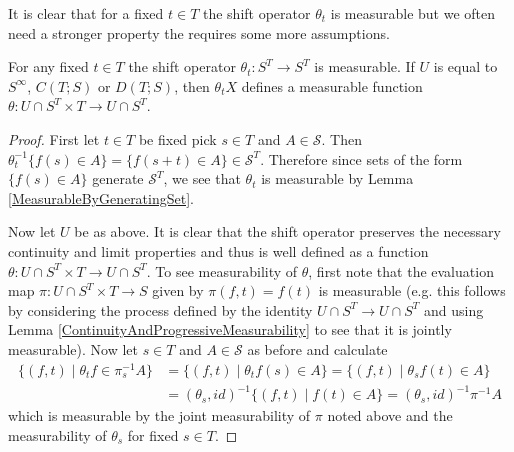 It is clear that for a fixed $t \in T$ the shift operator $\theta_t$
is measurable but we often need a stronger property the requires some
more assumptions.
\begin{lem}\label{MeasurabilityOfShiftOperator}For any fixed $t \in T$ the shift operator $\theta_t : S^T
  \to S^T$ is measurable. If $U$ is equal to $S^\infty$, $C(T; S)$ or
  $D(T; S)$, then $\theta_t X$ defines a measurable function $\theta : U \cap S^T \times
  T \to U \cap S^T$.  
\end{lem}
\begin{proof}
First let $t \in T$ be fixed pick $s \in T$ and $A \in \mathcal{S}$.
Then $\theta_t^{-1} \lbrace f(s) \in A \rbrace = \lbrace f(s+t) \in A
\rbrace \in \mathcal{S}^T$.  Therefore since sets of the form $\lbrace f(s) \in A \rbrace$ generate
$\mathcal{S}^T$, we see that $\theta_t$ is measurable by Lemma
\ref{MeasurableByGeneratingSet}.

Now let $U$ be as above.  It is clear that the shift operator
preserves the necessary continuity and limit properties and thus is
well defined as a function $\theta : U \cap S^T \times T \to U \cap S^T$.  To
see measurability of $\theta$, first note that the evaluation map $\pi : U \cap S^T \times
T \to S$ given by $\pi(f,t) = f(t)$ is measurable (e.g. this follows
by considering the process defined by the identity $U
\cap S^T \to U \cap S^T$ and using Lemma
\ref{ContinuityAndProgressiveMeasurability} to see that it is jointly
measurable).
Now let $s \in T$ and $A
\in \mathcal{S}$ as before and calculate
\begin{align*}
\lbrace (f, t) \mid \theta_t f \in \pi_s^{-1} A \rbrace
&=
\lbrace (f, t) \mid \theta_t f(s) \in  A \rbrace 
=\lbrace (f, t) \mid \theta_s f(t) \in  A \rbrace \\
&= (\theta_s, id)^{-1} \lbrace (f, t) \mid f(t) \in  A \rbrace
= (\theta_s, id)^{-1} \pi^{-1} A
\end{align*}
which is measurable by the joint measurability of $\pi$ noted above
and the measurability of $\theta_s$ for fixed $s \in T$.
\end{proof}


